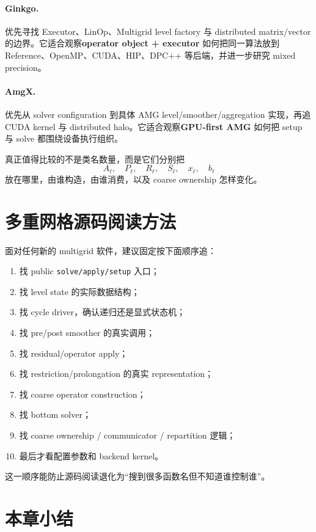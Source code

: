 \paragraph{Ginkgo.}
优先寻找 Executor、LinOp、Multigrid level factory 与 distributed matrix/vector 的边界。它适合观察\textbf{operator object + executor} 如何把同一算法放到 Reference、OpenMP、CUDA、HIP、DPC++ 等后端，并进一步研究 mixed precision。

\paragraph{AmgX.}
优先从 solver configuration 到具体 AMG level/smoother/aggregation 实现，再追 CUDA kernel 与 distributed halo。它适合观察\textbf{GPU-first AMG} 如何把 setup 与 solve 都围绕设备执行组织。

真正值得比较的不是类名数量，而是它们分别把
\[
A_\ell,\quad P_\ell,\quad R_\ell,\quad
S_\ell,\quad x_\ell,\quad b_\ell
\]
放在哪里，由谁构造，由谁消费，以及 coarse ownership 怎样变化。

\section{多重网格源码阅读方法}

面对任何新的 multigrid 软件，建议固定按下面顺序追：

\begin{enumerate}
\item 找 public \texttt{solve/apply/setup} 入口；
\item 找 level state 的实际数据结构；
\item 找 cycle driver，确认递归还是显式状态机；
\item 找 pre/post smoother 的真实调用；
\item 找 residual/operator apply；
\item 找 restriction/prolongation 的真实 representation；
\item 找 coarse operator construction；
\item 找 bottom solver；
\item 找 coarse ownership / communicator / repartition 逻辑；
\item 最后才看配置参数和 backend kernel。
\end{enumerate}

这一顺序能防止源码阅读退化为“搜到很多函数名但不知道谁控制谁”。

\section{本章小结}

